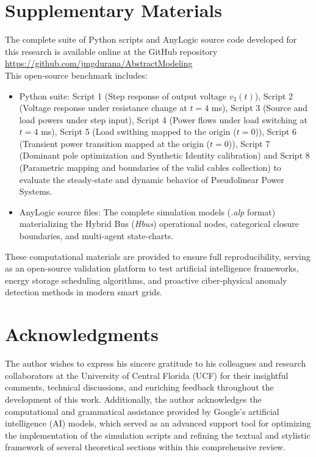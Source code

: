 \documentclass[11pt, a4paper]{article}
\begin{document}
\section*{Supplementary Materials}
The complete suite of Python scripts and AnyLogic source code developed for this research is available online at the GitHub repository\;  \url{https://github.com/jmgdurana/AbstractModeling}\\
This open-source benchmark includes:
\begin{itemize}
\item {Python suite:}
Script 1 (Step response of output voltage $v_3(t)$),
Script 2 (Voltage response under resistance change at $t=4$ ms),
Script 3 (Source and load powers under step input),
Script 4 (Power flows under load switching at $t=4$ ms),
Script 5 (Load swithing mapped to the origin ($t=0$)),
Script 6 (Transient power transition mapped at the origin ($t=0$)),
Script 7 (Dominant pole optimization and Synthetic Identity calibration) and
Script 8 (Parametric mapping and boundaries of the valid cables collection)
 to evaluate the steady-state and dynamic behavior of Pseudolinear Power Systems.
    \item {AnyLogic source files:} The complete simulation models (\textit{.alp} format) materializing the Hybrid Bus (\textit{Hbus}) operational nodes, categorical closure boundaries, and multi-agent state-charts.
\end{itemize}



These computational materials are provided to ensure full reproducibility, serving as an open-source validation platform to test artificial intelligence frameworks, energy storage scheduling algorithms, and proactive ciber-physical anomaly detection methods in modern smart grids.


\section*{Acknowledgments}
The author wishes to express his sincere gratitude to his colleagues and research collaborators at the University of Central Florida (UCF) for their insightful comments, technical discussions, and enriching feedback throughout the development of this work. Additionally, the author acknowledges the computational and grammatical assistance provided by Google's artificial intelligence (AI) models, which served as an advanced support tool for optimizing the implementation of the simulation scripts and refining the textual and stylistic framework of several theoretical sections within this comprehensive review.




\end{document}
